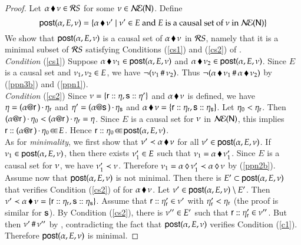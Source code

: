 \begin{proof}




Let ${\alpha}\,\blacklozenge\,{\nu} \in {\mathcal RS}$ for some $\nu\in \mathcal{N\!E}({\sf N})$. Define
\[
{\sf post}(\alpha,E,\nu)=\{{\alpha}\,\blacklozenge\,{\nu'}\mid\nu'
    \in E\text{ and $E$ is a causal set of $\nu$ in $\mathcal{N\!E}({\sf N})$}\}
    \]
We show that ${\sf post}(\alpha,E,\nu)$ is a causal set of
${\alpha}\,\blacklozenge\,{\nu}$ in ${\mathcal RS}$, namely that it is a minimal subset
of ${\mathcal RS}$ satisfying Conditions (\ref{cs1}) and (\ref{cs2}) of
.\\ %
{\em Condition }(\ref{cs1}) Suppose ${\alpha}\,\blacklozenge\,{\nu_1}\in
{\sf post}(\alpha,E,\nu)$ and ${\alpha}\,\blacklozenge\,{\nu_2}\in
{\sf post}(\alpha,E,\nu)$. Since $E$ is a causal set  and
$\nu_1, \nu_2 \in E$, we have
$\neg(\nu_1\,\#\,\nu_2)$. Thus
$\neg({\alpha}\,\blacklozenge\,{\nu_1}\,\#\,{\alpha}\,\blacklozenge\,{\nu_2})$ by
(\ref{ppn3b}) and (\ref{ppn1}). \\
{\em Condition }(\ref{cs2}) Since $\nu=\{{\sf r}:: \eta,
  {\sf s}:: \eta'\}$ and ${\alpha}\,\blacklozenge\,{\nu}$ is defined,
 we have $\eta={(\alpha @ {\sf r}\,)\,{\cdot}\,\eta_{{\sf r}}}$ and
$\eta'=(\alpha @ {\sf s}\,)\,{\cdot}\,\eta_{{\sf s}}$ and  ${\alpha}\,\blacklozenge\,{\nu}
=\{{\sf r}:: \eta_{{\sf r}}, {\sf s}:: \eta_{{\sf s}}\}$.
Let $\eta_0 < \eta_{{\sf r}}$. Then
$(\alpha @ {\sf r}\,)\,{\cdot}\,\eta_0 <
(\alpha @ {\sf r}\,)\,{\cdot}\,\eta_{\sf r} = \eta$. 
Since $E$ is a causal set for $\nu$ in $\mathcal{N\!E}({\sf N})$, this implies 
${\sf r}:: (\alpha @ {\sf r}\,)\,{\cdot}\,\eta_0\!\in\!\in\!E$. 
Hence ${\sf r}:: \eta_0\!\in\!\in\!{\sf post}(\alpha,E,\nu)$. 
\\
As for {\em minimality}, we first show that $\nu'\prec
{\alpha}\,\blacklozenge\,{\nu} $ for all $\nu'\in{\sf post}(\alpha,E,\nu)$.
If $ \nu_1\in {\sf post}(\alpha,E,\nu)$, then there exists
$\nu'_1 \in E$ such that $\nu_1 ={\alpha}\,\blacklozenge\,{\nu'_1}$. Since
$E$ is a causal set for $\nu$, we have $\nu'_1 \prec
\nu$. Therefore $\nu_1 =
{\alpha}\,\lozenge\,{\nu'_1}\prec{\alpha}\,\lozenge\,{\nu}$ by
(\ref{ppn2b}). Assume now that
${\sf post}(\alpha,E,\nu)$ is not minimal.  Then there is
$E'\subset{\sf post}(\alpha,E,\nu)$ that verifies Condition
(\ref{cs2}) of  for ${\alpha}\,\blacklozenge\,{\nu}$.
%
Let $\nu'\in {\sf post}(\alpha,E,\nu)\setminus E'$. Then
$\nu'\prec {\alpha}\,\blacklozenge\,{\nu}=\{{\sf r}:: \eta_{{\sf r}},
  {\sf s}:: \eta_{{\sf s}}\}$. Assume that
${\sf r}:: \eta'_{{\sf r}}\in\nu'$ with
$\eta'_{{\sf r}}<\eta_{{\sf r}}$ (the proof is similar for ${\sf s}$).  By
Condition (\ref{cs2}), there is $\nu''\in E'$ such that
${\sf r}:: \eta'_{{\sf r}}\in\nu''$.  But then
$\nu'\,\#\,\nu''$ by , contradicting the fact
that ${\sf post}(\alpha,E,\nu)$ verifies Condition
(\ref{c1}). Therefore ${\sf post}(\alpha,E,\nu)$ is minimal.
\end{proof}
